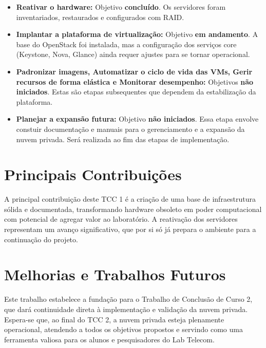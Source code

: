 \begin{itemize}
    \item \textbf{Reativar o hardware:} Objetivo \textbf{concluído}. Os servidores foram inventariados, restaurados e configurados com RAID.
    \item \textbf{Implantar a plataforma de virtualização:} Objetivo \textbf{em andamento}. A base do OpenStack foi instalada, mas a configuração dos serviços core (Keystone, Nova, Glance) ainda requer ajustes para se tornar operacional.
    \item \textbf{Padronizar imagens, Automatizar o ciclo de vida das VMs, Gerir recursos de forma elástica e Monitorar desempenho:} Objetivos \textbf{não iniciados}. Estas são etapas subsequentes que dependem da estabilização da plataforma.
    \item \textbf{Planejar a expansão futura:} Objetivo \textbf{não iniciados}. Essa etapa envolve constuir documentação e manuais para o gerenciamento e a expansão da nuvem privada. Será realizada ao fim das etapas de implementação.
\end{itemize}

\section{Principais Contribuições}

A principal contribuição deste TCC 1 é a criação de uma base de infraestrutura sólida e documentada, transformando hardware obsoleto em poder computacional com potencial de agregar valor ao laboratório. A reativação dos servidores representam um avanço significativo, que por si só já prepara o ambiente para a continuação do projeto.

\section{Melhorias e Trabalhos Futuros}

Este trabalho estabelece a fundação para o Trabalho de Conclusão de Curso 2, que dará continuidade direta à implementação e validação da nuvem privada. Espera-se que, ao final do TCC 2, a nuvem privada esteja plenamente operacional, atendendo a todos os objetivos propostos e servindo como uma ferramenta valiosa para os alunos e pesquisadores do Lab Telecom.